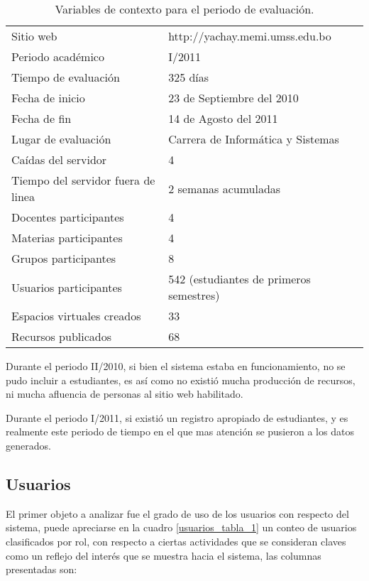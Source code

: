 \begin{table}
\centering
\begin{tabular}{|l|l|}
\hline
Sitio web                          & http://yachay.memi.umss.edu.bo \\
Periodo académico                  & I/2011 \\
Tiempo de evaluación               & 325 días \\
Fecha de inicio                    & 23 de Septiembre del 2010 \\
Fecha de fin                       & 14 de Agosto del 2011 \\
Lugar de evaluación                & Carrera de Informática y Sistemas \\
Caídas del servidor                & 4 \\
Tiempo del servidor fuera de linea & 2 semanas acumuladas \\
Docentes participantes             & 4 \\
Materias participantes             & 4 \\
Grupos participantes               & 8 \\
Usuarios participantes             & 542 (estudiantes de primeros semestres) \\
Espacios virtuales creados         & 33 \\
Recursos publicados                & 68 \\
\hline
\end{tabular}
\caption{Variables de contexto para el periodo de evaluación.}
\label{contexto}
\end{table}

Durante el periodo II/2010, si bien el sistema estaba en funcionamiento, no se
pudo incluir a estudiantes, es así como no existió mucha producción de recursos,
ni mucha afluencia de personas al sitio web habilitado.

Durante el periodo I/2011, si existió un registro apropiado de estudiantes, y es
realmente este periodo de tiempo en el que mas atención se pusieron a los datos
generados.

\subsection{Usuarios}
El primer objeto a analizar fue el grado de uso de los usuarios con respecto del
sistema, puede apreciarse en la cuadro \ref{usuarios_tabla_1} un conteo de
usuarios clasificados por rol, con respecto a ciertas actividades que se consideran claves como un reflejo del interés que se muestra hacia el sistema, las
columnas presentadas son:

